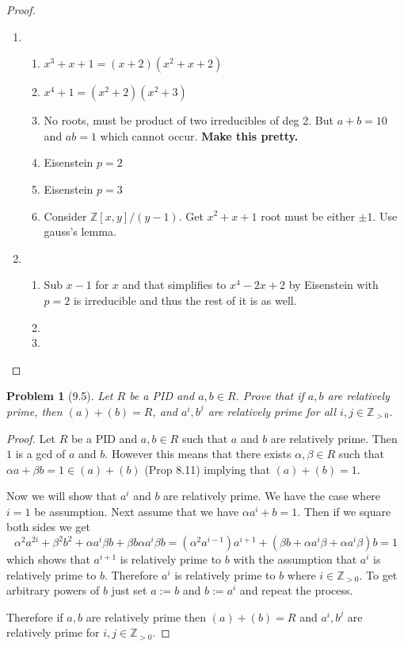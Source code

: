 \documentclass[10pt]{article}
\newcommand{\sk}{\vskip 10mm}
\newcommand{\bb}[1]{\mathbb{#1}}
\theoremstyle{plain}
\newtheorem{problem}{Problem}
\theoremstyle{remark}
\begin{document}
\begin{proof}
  \begin{enumerate}
  \item
    \begin{enumerate}
    \item $x^3+x+1=(x+2)(x^2+x+2)$
    \item $x^4+1=(x^2+2)(x^2+3)$
    \item No roots, must be product of two irreducibles of deg 2. But $a+b=10$
      and $ab=1$ which cannot occur. \textbf{Make this pretty.}
    \item Eisenstein $p=2$
    \item Eisenstein $p=3$
    \item Consider $\bb{Z}[x,y]/(y-1)$. Get $x^2+x+1$ root must be either $\pm 1$.
      Use gauss's lemma.
    \end{enumerate}
  \item
    \begin{enumerate}
    \item Sub $x-1$ for $x$ and that simplifies to $x^4-2x+2$ by Eisenstein with
      $p=2$ is irreducible and thus the rest of it is as well.
    \item 
    \item 
    \end{enumerate}

  \end{enumerate}
  \end{proof}

\sk


\begin{problem}[9.5]
  Let $R$ be a PID and $a,b\in R$. Prove that if $a,b$ are relatively
  prime, then $(a)+(b)=R$, and $a^i,b^j$ are relatively prime for all
  $i,j\in\bb{Z}_{>0}$.
\end{problem}

\begin{proof}
  Let $R$ be a PID and $a,b\in R$ such that $a$ and $b$ are relatively prime.
  Then $1$ is a gcd of $a$ and $b$. However this means that
  there exists $\alpha,\beta\in R$ such that $\alpha a+\beta b = 1\in (a)+(b)$ (Prop 8.11) implying that
  $(a)+(b)=1$.

  Now we will show that $a^i$ and $b$ are relatively prime. We have the case where
  $i=1$ be assumption. Next assume that we have $\alpha a^i+b=1$. Then if we square
  both sides we get
  \[ \alpha^2a^{2i}+\beta^2b^2+\alpha a^i\beta b+\beta b \alpha a^i \beta b = (\alpha^2a^{i-1})a^{i+1}+(\beta b+\alpha a^i \beta +\alpha a^i\beta)b=1 \]
  which shows that $a^{i+1}$ is relatively prime to $b$ with the assumption that
  $a^i$ is relatively prime to $b$. Therefore $a^i$ is relatively prime to $b$ where
  $i\in \bb{Z}_{>0}$. To get arbitrary powers of $b$ just set $a:=b$ and $b:=a^i$
  and repeat the process.

  Therefore if $a,b$ are relatively prime then $(a)+(b)=R$ and $a^i,b^j$ are relatively
  prime for $i,j\in\bb{Z}_{>0}$.
\end{proof}
\end{document}

